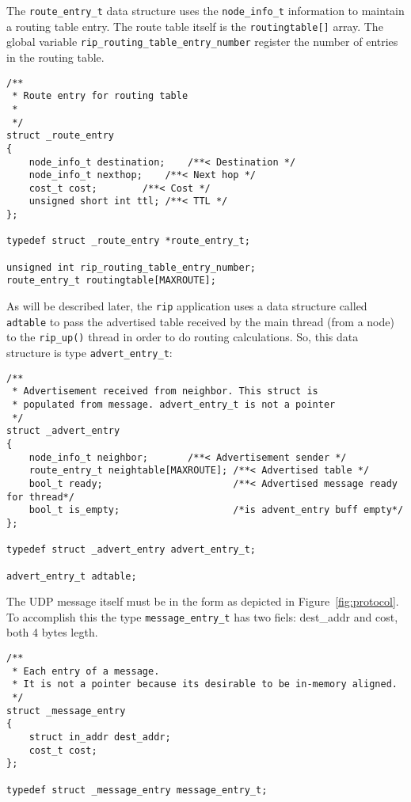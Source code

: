 \documentclass[10pt]{extarticle}
\begin{document}
The \texttt{route\_entry\_t} data structure uses the \texttt{node\_info\_t}
information to maintain a routing table entry. The route table itself is the
\texttt{routingtable[]} array. The global variable
\texttt{rip\_routing\_table\_entry\_number} register the number of entries in the
routing table.

\begin{lstlisting}
/**
 * Route entry for routing table
 * 
 */
struct _route_entry
{
    node_info_t destination;	/**< Destination */
    node_info_t nexthop;	/**< Next hop */
    cost_t cost;		/**< Cost */
    unsigned short int ttl;	/**< TTL */
};

typedef struct _route_entry *route_entry_t;

unsigned int rip_routing_table_entry_number;
route_entry_t routingtable[MAXROUTE];
\end{lstlisting}

As will be described later, the \texttt{rip} application uses a data structure
called \texttt{adtable} to pass the advertised table received by the main thread
(from a node) to the \texttt{rip\_up()} thread in order to do routing
calculations. So, this data structure is type \texttt{advert\_entry\_t}:

\begin{lstlisting}
/**
 * Advertisement received from neighbor. This struct is 
 * populated from message. advert_entry_t is not a pointer
 */
struct _advert_entry
{
    node_info_t neighbor;		/**< Advertisement sender */
    route_entry_t neightable[MAXROUTE]; /**< Advertised table */
    bool_t ready;                       /**< Advertised message ready for thread*/
    bool_t is_empty;                    /*is advent_entry buff empty*/
};

typedef struct _advert_entry advert_entry_t;

advert_entry_t adtable;
\end{lstlisting}

The UDP message itself must be in the form as depicted in
Figure~\ref{fig:protocol}. To accomplish this the type
\texttt{message\_entry\_t} has two fiels: dest\_addr and cost, both 4 bytes legth.

\begin{lstlisting}
/**
 * Each entry of a message. 
 * It is not a pointer because its desirable to be in-memory aligned.
 */
struct _message_entry 
{
    struct in_addr dest_addr;
    cost_t cost;
};

typedef struct _message_entry message_entry_t;
\end{lstlisting}
\end{document}
